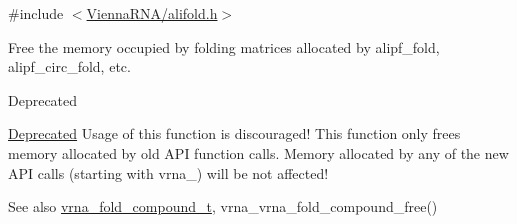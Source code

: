 {\ttfamily \#include $<$\hyperlink{alifold_8h}{Vienna\+R\+N\+A/alifold.\+h}$>$}



Free the memory occupied by folding matrices allocated by alipf\+\_\+fold, alipf\+\_\+circ\+\_\+fold, etc. 

\begin{DoxyRefDesc}{Deprecated}
\item[\hyperlink{deprecated__deprecated000022}{Deprecated}]Usage of this function is discouraged! This function only free\textquotesingle{}s memory allocated by old A\+PI function calls. Memory allocated by any of the new A\+PI calls (starting with vrna\+\_\+) will be not affected!\end{DoxyRefDesc}


\begin{DoxySeeAlso}{See also}
\hyperlink{group__fold__compound_ga1b0cef17fd40466cef5968eaeeff6166}{vrna\+\_\+fold\+\_\+compound\+\_\+t}, vrna\+\_\+vrna\+\_\+fold\+\_\+compound\+\_\+free() 
\end{DoxySeeAlso}
